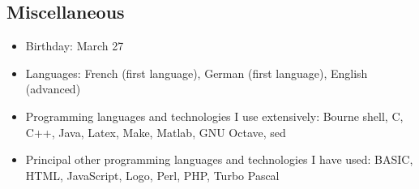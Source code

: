 \documentclass[line,mm]{res}
\newcounter{x}
\begin{document}
\begin{resume}
\section{Miscellaneous}
\begin{itemize}
  \item Birthday:  March 27
  \item Languages: French (first language), German (first language),
    English (advanced)
  \item Programming languages and technologies I use extensively:
    Bourne shell, C, C++, Java, Latex, Make, Matlab, GNU Octave, sed
  \item Principal other programming languages and technologies I have used:
    BASIC, HTML, JavaScript, Logo, Perl, PHP, Turbo Pascal 
\end{itemize}

\end{resume}
\end{document}
